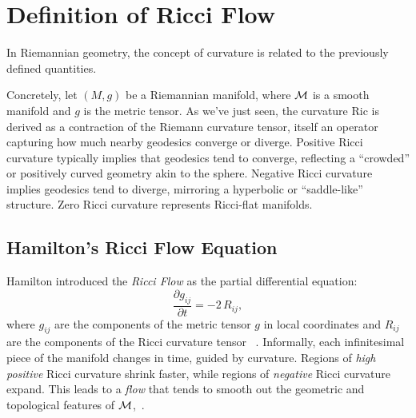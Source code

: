 \section{Definition of Ricci Flow}
In Riemannian geometry, the concept of curvature is related to the previously defined quantities.

\begin{comment}
In classical Riemannian geometry, curvature can be examined from multiple perspectives. One can study the \emph{sectional curvature}, which measures how a two-dimensional plane (spanned by two tangent directions) curves. One can also investigate the \emph{Ricci curvature}, which is obtained by summing or averaging the sectional curvatures over all planes containing a given direction. Ricci's curvature has special importance: for instance, it appears in Einstein's equations of General Relativity, linking geometry to matter and energy distributions in spacetime. 
\end{comment}

Concretely, let $(M,g)$ be a Riemannian manifold, where $\mathcal{M}$ is a smooth manifold and $g$ is the metric tensor. As we've just seen, the curvature $\mathrm{Ric}$ is derived as a contraction of the Riemann curvature tensor, itself an operator capturing how much nearby geodesics converge or diverge. Positive Ricci curvature typically implies that geodesics tend to converge, reflecting a ``crowded'' or positively curved geometry akin to the sphere. Negative Ricci curvature implies geodesics tend to diverge, mirroring a hyperbolic or “saddle-like” structure. Zero Ricci curvature represents Ricci-flat manifolds.

\subsection{Hamilton's Ricci Flow Equation}
Hamilton introduced the \emph{Ricci Flow} as the partial differential equation:
\begin{equation}
\frac{\partial g_{ij}}{\partial t} = -2 \, R_{ij},
\end{equation}
where $g_{ij}$ are the components of the metric tensor $g$ in local coordinates and $R_{ij}$ are the components of the Ricci curvature tensor ~\cite{recentdevelopmentsricciflows}. Informally, each infinitesimal piece of the manifold changes in time, guided by curvature. Regions of \emph{high positive} Ricci curvature shrink faster, while regions of \emph{negative} Ricci curvature expand. This leads to a \emph{flow} that tends to smooth out the geometric and topological features of $\mathcal{M}$,~\cite{theRicciFlowAnIntroduction}.

